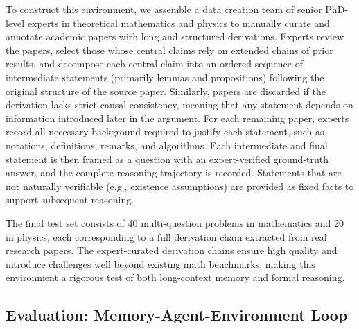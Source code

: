 To construct this environment, we assemble a data creation team of senior PhD-level experts in theoretical mathematics and physics to manually curate and annotate academic papers with long and structured derivations. Experts review the papers,  select those whose central claims rely on extended chains of prior results, and decompose each central claim into an ordered sequence of intermediate statements (primarily lemmas and propositions) following the original structure of the source paper. Similarly, papers are discarded if the derivation lacks strict causal consistency, meaning that any statement depends on information introduced later in the argument.  For each remaining paper, experts record all necessary background required to justify each statement, such as notations, definitions, remarks, and algorithms. Each intermediate and final statement is then framed as a question with an expert-verified ground-truth answer, and the complete reasoning trajectory is recorded. Statements that are not naturally verifiable (e.g., existence assumptions) are provided as fixed facts to support subsequent reasoning. 


The final test set consists of 40 multi-question problems in mathematics and 20 in physics, each corresponding to a full derivation chain extracted from real research papers. The expert-curated derivation chains ensure high quality and introduce challenges well beyond existing math benchmarks, making this environment a rigorous test of both long-context memory and formal reasoning.



\subsection{Evaluation: Memory-Agent-Environment Loop}


